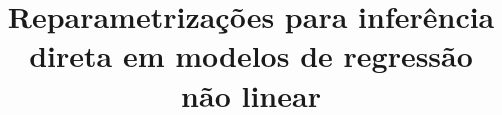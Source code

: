 \documentclass[10pt]{article}
\title{Reparametrizações para inferência direta em modelos de regressão não linear}
\date{}
\begin{document}
\maketitle

\begin{abstract}

\end{abstract}



\begin{singlespace}
\renewcommand\refname{}
\begin{flushleft}

\end{flushleft}
\end{singlespace}

% 
\end{document}
